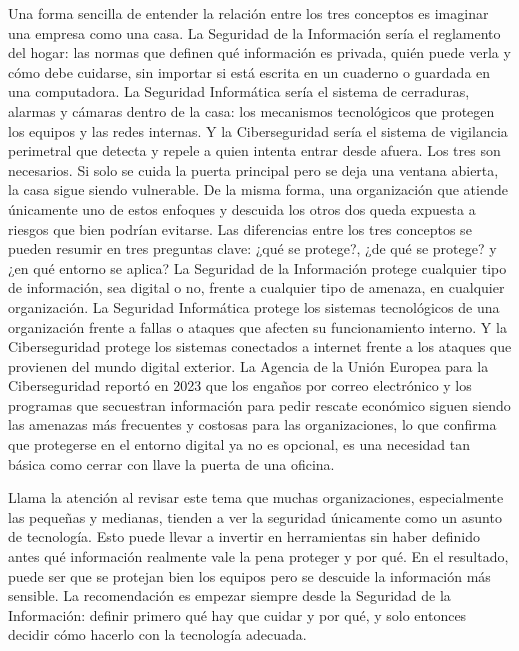 \documentclass[
	article,			%
	11pt,				%
	oneside,			%
	a4paper,			%
	english,			%
	brazil,				%
	sumario=tradicional
	]{abntex2}
\begin{document}
Una forma sencilla de entender la relación entre los tres conceptos es imaginar una empresa como una casa. La Seguridad de la Información sería el reglamento del hogar: las normas que definen qué información es privada, quién puede verla y cómo debe cuidarse, sin importar si está escrita en un cuaderno o guardada en una computadora. La Seguridad Informática sería el sistema de cerraduras, alarmas y cámaras dentro de la casa: los mecanismos tecnológicos que protegen los equipos y las redes internas. Y la Ciberseguridad sería el sistema de vigilancia perimetral que detecta y repele a quien intenta entrar desde afuera. Los tres son necesarios. Si solo se cuida la puerta principal pero se deja una ventana abierta, la casa sigue siendo vulnerable. De la misma forma, una organización que atiende únicamente uno de estos enfoques y descuida los otros dos queda expuesta a riesgos que bien podrían evitarse. Las diferencias entre los tres conceptos se pueden resumir en tres preguntas clave: ¿qué se protege?, ¿de qué se protege? y ¿en qué entorno se aplica? La Seguridad de la Información protege cualquier tipo de información, sea digital o no, frente a cualquier tipo de amenaza, en cualquier organización. La Seguridad Informática protege los sistemas tecnológicos de una organización frente a fallas o ataques que afecten su funcionamiento interno. Y la Ciberseguridad protege los sistemas conectados a internet frente a los ataques que provienen del mundo digital exterior. La Agencia de la Unión Europea para la Ciberseguridad reportó en 2023 que los engaños por correo electrónico y los programas que secuestran información para pedir rescate económico siguen siendo las amenazas más frecuentes y costosas para las organizaciones, lo que confirma que protegerse en el entorno digital ya no es opcional, es una necesidad tan básica como cerrar con llave la puerta de una oficina.

Llama la atención al revisar este tema que muchas organizaciones, especialmente las pequeñas y medianas, tienden a ver la seguridad únicamente como un asunto de tecnología. Esto puede llevar a invertir en herramientas sin haber definido antes qué información realmente vale la pena proteger y por qué. En el resultado, puede ser que se protejan bien los equipos pero se descuide la información más sensible. La recomendación es empezar siempre desde la Seguridad de la Información: definir primero qué hay que cuidar y por qué, y solo entonces decidir cómo hacerlo con la tecnología adecuada.
\end{document}
